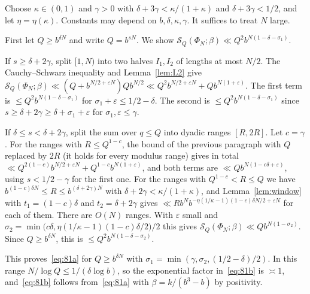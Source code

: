 \documentclass[11pt]{amsart}
\makeatletter
\theoremstyle{definition}
\numberwithin{equation}{section}
\renewenvironment{proof}[1][\proofname]{\par\pushQED{\qed}\normalfont\topsep6\p@\@plus6\p@\relax\trivlist\item[\hskip\labelsep\upshape#1.]\ignorespaces}{\popQED\endtrivlist\@endpefalse}
\newcommand{\FS}{\mathcal{S}}
\makeatother
\begin{document}
\begin{proof}
Choose $\kappa\in(0,1)$ and $\gamma>0$ with $\delta+3\gamma<\kappa/(1+\kappa)$ and $\delta+3\gamma<1/2$, and let $\eta=\eta(\kappa)$. Constants may depend on $b,\delta,\kappa,\gamma$. It suffices to treat $N$ large.

First let $Q\ge b^{\delta N}$ and write $Q=b^{sN}$. We show $\FS_Q(\Phi_N;\beta)\ll Q^2b^{N(1-\delta-\sigma_1)}$.

If $s\ge\delta+2\gamma$, split $[1,N)$ into two halves $I_1,I_2$ of lengths at most $N/2$. The Cauchy--Schwarz inequality and Lemma~\ref{lem:L2} give $\FS_Q(\Phi_N;\beta)\ll(Q+b^{N/2+\varepsilon N})Qb^{N/2}\ll Q^2b^{N/2+\varepsilon N}+Qb^{N(1+\varepsilon)}$. The first term is $\le Q^2b^{N(1-\delta-\sigma_1)}$ for $\sigma_1+\varepsilon\le1/2-\delta$. The second is $\le Q^2b^{N(1-\delta-\sigma_1)}$ since $s\ge\delta+2\gamma\ge\delta+\sigma_1+\varepsilon$ for $\sigma_1,\varepsilon\le\gamma$.

If $\delta\le s<\delta+2\gamma$, split the sum over $q\le Q$ into dyadic ranges $[R,2R]$. Let $c=\gamma$. For the ranges with $R\le Q^{1-c}$, the bound of the previous paragraph with $Q$ replaced by $2R$ (it holds for every modulus range) gives in total $\ll Q^{2(1-c)}b^{N/2+\varepsilon N}+Q^{1-c}b^{N(1+\varepsilon)}$, and both terms are $\ll Qb^{N(1-c\delta+\varepsilon)}$, using $s<1/2-\gamma$ for the first one. For the ranges with $Q^{1-c}<R\le Q$ we have $b^{(1-c)\delta N}\le R\le b^{(\delta+2\gamma)N}$ with $\delta+2\gamma<\kappa/(1+\kappa)$, and Lemma~\ref{lem:window} with $t_1=(1-c)\delta$ and $t_2=\delta+2\gamma$ gives $\ll Rb^Nb^{-\eta(1/\kappa-1)(1-c)\delta N/2+\varepsilon N}$ for each of them. There are $O(N)$ ranges. With $\varepsilon$ small and $\sigma_2=\min\bigl(c\delta,\eta(1/\kappa-1)(1-c)\delta/2\bigr)/2$ this gives $\FS_Q(\Phi_N;\beta)\ll Qb^{N(1-\sigma_2)}$. Since $Q\ge b^{\delta N}$, this is $\le Q^2b^{N(1-\delta-\sigma_2)}$.

This proves~\eqref{eq:81a} for $Q\ge b^{\delta N}$ with $\sigma_1=\min(\gamma,\sigma_2,(1/2-\delta)/2)$. In this range $N/\log Q\le1/(\delta\log b)$, so the exponential factor in~\eqref{eq:81b} is $\asymp1$, and~\eqref{eq:81b} follows from~\eqref{eq:81a} with $\beta=k/(b^3-b)$ by positivity.


\end{proof}
\end{document}
